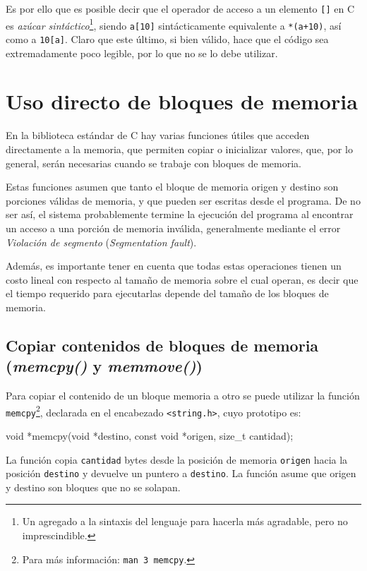 Es por ello que es posible decir que el operador de acceso a un elemento
\lstinline![]! en C es \textit{azúcar sintáctico}\footnote{Un agregado a la
sintaxis del lenguaje para hacerla más agradable, pero no imprescindible.},
siendo \lstinline!a[10]! sintácticamente equivalente a \lstinline!*(a+10)!,
así como a \lstinline!10[a]!. Claro que este último, si bien válido, hace que
el código sea extremadamente poco legible, por lo que no se lo debe utilizar.

\section{Uso directo de bloques de memoria}

En la biblioteca estándar de C hay varias funciones útiles que acceden
directamente a la memoria, que permiten copiar o inicializar valores, que,
por lo general, serán necesarias cuando se trabaje con bloques de memoria.

Estas funciones asumen que tanto el bloque de memoria origen y destino son
porciones válidas de memoria, y que pueden ser escritas desde el programa.  De
no ser así, el sistema probablemente termine la ejecución del programa al
encontrar un acceso a una porción de memoria inválida, generalmente mediante
el error \textit{Violación de segmento} (\textit{Segmentation fault}).

Además, es importante tener en cuenta que todas estas operaciones tienen un
costo lineal con respecto al tamaño de memoria sobre el cual operan, es decir
que el tiempo requerido para ejecutarlas depende del tamaño de los bloques de
memoria.

\subsection{Copiar contenidos de bloques de memoria (\textit{memcpy()} y
\textit{memmove()})}

Para copiar el contenido de un bloque memoria a otro se puede utilizar la
función \lstinline!memcpy!\footnote{Para más información: \texttt{man 3
memcpy}.}, declarada en el encabezado \lstinline!<string.h>!, cuyo prototipo
es:

\begin{codigo-c-plano}
void *memcpy(void *destino, const void *origen, size_t cantidad);
\end{codigo-c-plano}

La función copia \lstinline!cantidad! bytes desde la posición de memoria
\lstinline!origen! hacia la posición \lstinline!destino! y devuelve un puntero
a \lstinline!destino!. La función asume que origen y destino son bloques que
no se solapan.

